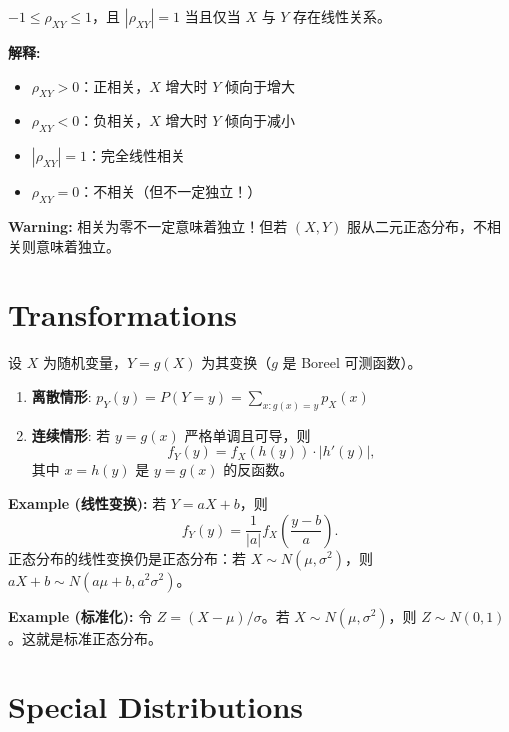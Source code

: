 \begin{Theorem}[相关系数的性质]\label{prop:correlation-properties}
$-1 \leq \rho_{XY} \leq 1$，且 $|\rho_{XY}| = 1$ 当且仅当 $X$ 与 $Y$ 存在线性关系。
\end{Theorem}

\textbf{解释:}
\begin{itemize}
    \item $\rho_{XY} > 0$：正相关，$X$ 增大时 $Y$ 倾向于增大
    \item $\rho_{XY} < 0$：负相关，$X$ 增大时 $Y$ 倾向于减小
    \item $|\rho_{XY}| = 1$：完全线性相关
    \item $\rho_{XY} = 0$：不相关（但不一定独立！）
\end{itemize}

\textbf{Warning:} 相关为零不一定意味着独立！但若 $(X, Y)$ 服从二元正态分布，不相关则意味着独立。

\section{Transformations}\label{sec:transformations}

设 $X$ 为随机变量，$Y = g(X)$ 为其变换（$g$ 是 Boreel 可测函数）。

\begin{Theorem}[随机变量变换]\label{prop:transformation}
\begin{enumerate}
    \item \textbf{离散情形}: $p_Y(y) = P(Y = y) = \sum_{x: g(x)=y} p_X(x)$

    \item \textbf{连续情形}: 若 $y = g(x)$ 严格单调且可导，则
    \[
    f_Y(y) = f_X(h(y)) \cdot |h'(y)|,
    \]
    其中 $x = h(y)$ 是 $y = g(x)$ 的反函数。
\end{enumerate}
\end{Theorem}

\bigskip

\textbf{Example (线性变换):} 若 $Y = aX + b$，则
\[
f_Y(y) = \frac{1}{|a|} f_X\left(\frac{y-b}{a}\right).
\]
正态分布的线性变换仍是正态分布：若 $X \sim N(\mu, \sigma^2)$，则 $aX + b \sim N(a\mu + b, a^2\sigma^2)$。

\bigskip

\textbf{Example (标准化):} 令 $Z = (X - \mu) / \sigma$。若 $X \sim N(\mu, \sigma^2)$，则 $Z \sim N(0, 1)$。这就是标准正态分布。

\section{Special Distributions}\label{sec:special-distributions}

